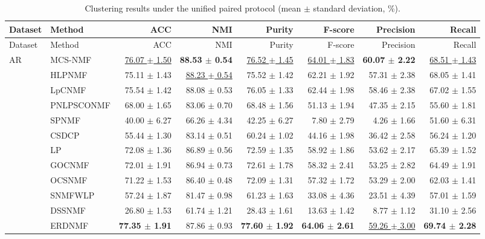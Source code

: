 \begin{landscape}
\fontsize{6.5}{7.2}\selectfont
\renewcommand{\arraystretch}{0.88}
\setlength{\tabcolsep}{2.2pt}
\begin{longtable}{llrrrrrr}
\caption{Clustering results under the unified paired protocol (mean $\pm$ standard deviation, \%).}\label{tab:unified_main}\\
\toprule Dataset & Method & ACC & NMI & Purity & F-score & Precision & Recall \\
\midrule\endfirsthead
\toprule Dataset & Method & ACC & NMI & Purity & F-score & Precision & Recall \\
\midrule\endhead
AR & MCS-NMF & \underline{76.07 $\pm$ 1.50} & \textbf{88.53 $\pm$ 0.54} & \underline{76.52 $\pm$ 1.45} & \underline{64.01 $\pm$ 1.83} & \textbf{60.07 $\pm$ 2.22} & \underline{68.51 $\pm$ 1.43} \\
 & HLPNMF & 75.11 $\pm$ 1.43 & \underline{88.23 $\pm$ 0.54} & 75.52 $\pm$ 1.42 & 62.21 $\pm$ 1.92 & 57.31 $\pm$ 2.38 & 68.05 $\pm$ 1.41 \\
 & LpCNMF & 75.54 $\pm$ 1.42 & 88.08 $\pm$ 0.53 & 76.05 $\pm$ 1.33 & 62.44 $\pm$ 1.98 & 58.46 $\pm$ 2.38 & 67.02 $\pm$ 1.55 \\
 & PNLPSCONMF & 68.00 $\pm$ 1.65 & 83.06 $\pm$ 0.70 & 68.48 $\pm$ 1.56 & 51.13 $\pm$ 1.94 & 47.35 $\pm$ 2.15 & 55.60 $\pm$ 1.81 \\
 & SPNMF & 40.00 $\pm$ 6.27 & 66.26 $\pm$ 4.34 & 42.25 $\pm$ 6.27 & 7.80 $\pm$ 2.79 & 4.26 $\pm$ 1.66 & 51.60 $\pm$ 6.31 \\
 & CSDCP & 55.44 $\pm$ 1.30 & 83.14 $\pm$ 0.51 & 60.24 $\pm$ 1.02 & 44.16 $\pm$ 1.98 & 36.42 $\pm$ 2.58 & 56.24 $\pm$ 1.20 \\
 & LP & 72.08 $\pm$ 1.36 & 86.89 $\pm$ 0.56 & 72.59 $\pm$ 1.35 & 58.92 $\pm$ 1.86 & 53.62 $\pm$ 2.17 & 65.39 $\pm$ 1.52 \\
 & GOCNMF & 72.01 $\pm$ 1.91 & 86.94 $\pm$ 0.73 & 72.61 $\pm$ 1.78 & 58.32 $\pm$ 2.41 & 53.25 $\pm$ 2.82 & 64.49 $\pm$ 1.91 \\
 & OCSNMF & 71.22 $\pm$ 1.53 & 86.40 $\pm$ 0.48 & 72.09 $\pm$ 1.31 & 57.32 $\pm$ 1.72 & 53.29 $\pm$ 2.00 & 62.03 $\pm$ 1.41 \\
 & SNMFWLP & 57.24 $\pm$ 1.87 & 81.47 $\pm$ 0.98 & 61.23 $\pm$ 1.63 & 33.08 $\pm$ 4.36 & 23.51 $\pm$ 4.39 & 57.01 $\pm$ 1.59 \\
 & DSSNMF & 26.80 $\pm$ 1.53 & 61.74 $\pm$ 1.21 & 28.43 $\pm$ 1.61 & 13.63 $\pm$ 1.42 & 8.77 $\pm$ 1.12 & 31.10 $\pm$ 2.56 \\
 & ERDNMF & \textbf{77.35 $\pm$ 1.91} & 87.86 $\pm$ 0.93 & \textbf{77.60 $\pm$ 1.92} & \textbf{64.06 $\pm$ 2.61} & \underline{59.26 $\pm$ 3.00} & \textbf{69.74 $\pm$ 2.28} \\

\end{longtable}
\end{landscape}

